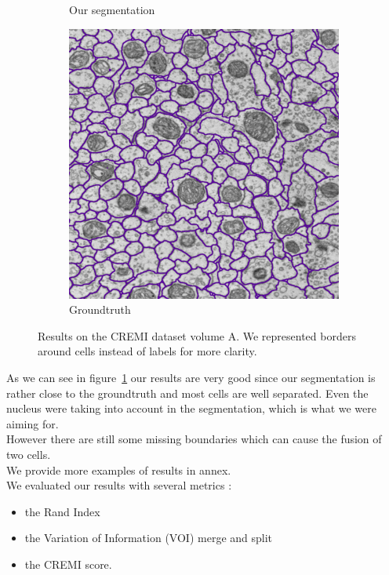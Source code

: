 \begin{figure}[!htbp]
\begin{subfigure}[t]{0.31\textwidth}
        \caption{Our segmentation}
    \end{subfigure}%
    \begin{subfigure}[t]{0.31\textwidth}
        \centering
        \includegraphics[height=0.9\textwidth]{./images/results/gt_1.png}
        \caption{Groundtruth}
    \end{subfigure}
	\caption{Results on the CREMI dataset volume A. We represented borders
	around cells instead of labels for more clarity.}
	\label{fig:cremi_results_s2_a}
\end{figure}


As we can see in figure~\ref{fig:cremi_results_s2_a} our results are very good
since our segmentation is rather close to the groundtruth and most cells are well separated.
Even the nucleus were taking into account in the segmentation, which is what we
were aiming for.\\
However there are still some missing boundaries which can cause the fusion of two cells.\\
We provide more examples of results in annex.\\

We evaluated our results with several metrics :
\begin{itemize}
  \item the Rand Index
  \item the Variation of Information (VOI) merge and split
  \item the CREMI score.
\end{itemize}

